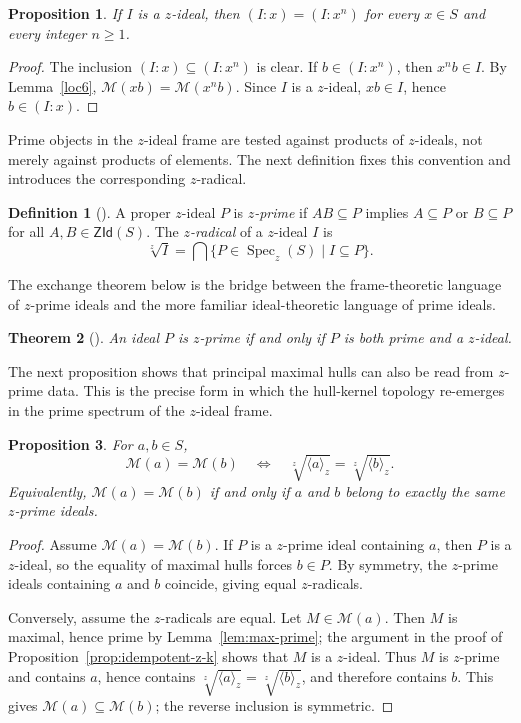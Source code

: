 \documentclass[11pt,leqno]{amsart}
\theoremstyle{plain}
\newtheorem{theorem}{Theorem}[section]
\newtheorem{proposition}[theorem]{Proposition}
\theoremstyle{definition}
\newtheorem{definition}{Definition}[section]
\theoremstyle{remark}
\numberwithin{equation}{section}
\DeclareMathOperator{\Spec}{Spec}
\newcommand{\ZId}{\mathsf{ZId}}
\newcommand{\M}{\mathcal M}
\newcommand{\ideal}[1]{\langle #1\rangle}
\begin{document}
\begin{proposition}\label{prop:colon}
If $I$ is a $z$-ideal, then $(I:x)=(I:x^n)$
for every $x\in S$ and every integer $n\geqslant1$.
\end{proposition}
\begin{proof}
The inclusion $(I:x)\subseteq(I:x^n)$ is clear.
If $b\in(I:x^n)$, then $x^nb\in I$.
By Lemma~\ref{loc6}, $\M(xb)=\M(x^n b)$.
Since $I$ is a $z$-ideal, $xb\in I$, hence $b\in(I:x)$.
\end{proof}

Prime objects in the $z$-ideal frame are tested against products
of $z$-ideals, not merely against products of elements.
The next definition fixes this convention and introduces the
corresponding $z$-radical.

\begin{definition}[\cite{AG23}]
A proper $z$-ideal $P$ is \emph{$z$-prime} if $AB\subseteq P$
implies $A\subseteq P$ or $B\subseteq P$ for all $A,B\in\ZId(S)$.
The \emph{$z$-radical} of a $z$-ideal $I$ is
\[
\sqrt[z]{I}=\bigcap\{P\in\Spec_z(S)\mid I\subseteq P\}.
\]
\end{definition}

The exchange theorem below is the bridge between the frame-theoretic
language of $z$-prime ideals and the more familiar ideal-theoretic
language of prime ideals.

\begin{theorem}[\cite{AG25}]\label{thm:zprime-exchange}
An ideal $P$ is $z$-prime if and only if $P$ is both prime and
a $z$-ideal.
\end{theorem}

The next proposition shows that principal maximal hulls can also
be read from $z$-prime data.
This is the precise form in which the hull-kernel topology
re-emerges in the prime spectrum of the $z$-ideal frame.

\begin{proposition}\label{prop:principal-radical-hulls}
For $a,b\in S$,
\[
\M(a)=\M(b)\quad\Longleftrightarrow\quad
\sqrt[z]{\ideal{a}_z}=\sqrt[z]{\ideal{b}_z}.
\]
Equivalently, $\M(a)=\M(b)$ if and only if $a$ and $b$ belong to
exactly the same $z$-prime ideals.
\end{proposition}
\begin{proof}
Assume $\M(a)=\M(b)$.
If $P$ is a $z$-prime ideal containing $a$, then $P$ is a $z$-ideal,
so the equality of maximal hulls forces $b\in P$.
By symmetry, the $z$-prime ideals containing $a$ and $b$ coincide,
giving equal $z$-radicals.

Conversely, assume the $z$-radicals are equal.
Let $M\in\M(a)$.  Then $M$ is maximal, hence prime by
Lemma~\ref{lem:max-prime}; the argument in the proof of
Proposition~\ref{prop:idempotent-z-k} shows that $M$ is a $z$-ideal.
Thus $M$ is $z$-prime and contains $a$,
hence contains $\sqrt[z]{\ideal{a}_z}=\sqrt[z]{\ideal{b}_z}$,
and therefore contains $b$.
This gives $\M(a)\subseteq\M(b)$; the reverse inclusion is symmetric.
\end{proof}
\end{document}
